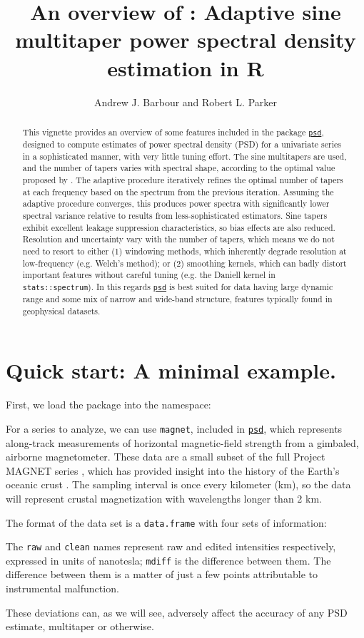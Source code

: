 \documentclass[10pt]{article}\usepackage[]{graphicx}\usepackage[]{color}
\title{An overview of \psd{}: Adaptive sine multitaper power spectral density estimation in R}
\author{Andrew J. Barbour and Robert L. Parker}
\newcommand{\Rcmd}[1]{\texttt{#1}}
\newcommand{\psd}[0]{\href{http://www.github.com/abarbour/psd/}{\color{blue}\Rcmd{psd}}}
\begin{document}
\maketitle

\begin{abstract}
  This vignette provides an overview of some 
  features included in the package \psd{}, designed to
  compute estimates of power spectral
  density (PSD) for a univariate series in a sophisticated manner,
  with very little tuning effort.
  The sine multitapers are used, and
  the number of tapers varies with spectral shape, according
  to the optimal value proposed by \citet{rs1995}.
  The adaptive procedure
  iteratively refines the optimal number of tapers at each frequency
  based on the spectrum from the previous iteration.
  Assuming the adaptive procedure converges, 
  this produces power spectra
  with significantly
  lower spectral variance 
  relative to results from less-sophisticated estimators.
  Sine tapers exhibit excellent
  leakage suppression characteristics, so bias effects
  are also reduced.
  Resolution and uncertainty vary with the number of tapers,
  which means we do
  not need to resort to either (1) windowing methods,
  which inherently degrade resolution at low-frequency
  (e.g. Welch's method); or (2) smoothing kernels,
  which can badly distort important features without careful tuning
  (e.g. the Daniell kernel in \Rcmd{stats::spectrum}).
  In this regards
  \psd{} is best suited for data having 
   large dynamic range and some mix of narrow and wide-band structure,
   features typically found in geophysical datasets.
\end{abstract}

\tableofcontents
\clearpage



\section{Quick start: A minimal example.}
First, we load the package into the namespace:

For a series to analyze, we can use \Rcmd{magnet}, included in \psd{},
which represents along-track measurements
of horizontal magnetic-field strength from a gimbaled, airborne magnetometer.
These data are a small subset of the full Project MAGNET series \citep{coleman1992},
which has provided insight into
the history of the Earth's oceanic crust 
\citep{parker1997, obrien1999, korte2002}.
The sampling interval is
once every kilometer (km), so the data will represent
crustal magnetization with wavelengths longer than 2 km.

The format of the data set is a \Rcmd{data.frame} with four
sets of information:

The \Rcmd{raw} and \Rcmd{clean} names represent raw
and edited intensities respectively, expressed in units of nanotesla; 
\Rcmd{mdiff} is the difference between them.
The difference between them is a matter of just a few points
attributable to instrumental malfunction. 

These deviations can,
as we will see, adversely affect the accuracy of any PSD estimate,
multitaper or otherwise.
\end{document}
